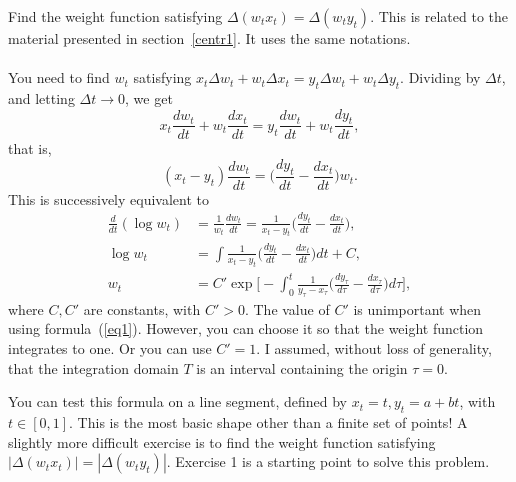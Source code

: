 \documentclass[oneside,10pt]{book}
\begin{document}
\begin{Exercise}Find the weight function satisfying $\Delta(w_t x_t)=\Delta(w_t y_t)$. This is related to the material presented in section~\ref{centr1}. It uses the same notations. \vspace{1ex} \\
 \vspace{1ex} \\
You need to find $w_t$ satisfying $x_t\Delta w_t + w_t\Delta x_t = y_t\Delta w_t + w_t\Delta y_t$. Dividing by $\Delta t$, and letting $\Delta t\rightarrow 0$, we get
$$x_t \frac{dw_t}{dt}+w_t  \frac{dx_t}{dt} = y_t \frac{dw_t}{dt}+w_t  \frac{dy_t}{dt},$$
that is,
$$(x_t - y_t) \frac{dw_t}{dt} = \Big(\frac{dy_t}{dt} - \frac{dx_t}{dt}\Big) w_t.$$
This is successively equivalent to
\begin{align}
\frac{d}{dt}(\log w_t) & = \frac{1}{w_t}\frac{dw_t}{dt}=\frac{1}{x_t - y_t} \Big(\frac{dy_t}{dt} - \frac{dx_t}{dt}\Big), \nonumber \\
\log w_t & = \int \frac{1}{x_t - y_t} \Big(\frac{dy_t}{dt} - \frac{dx_t}{dt}\Big)dt +C,  \nonumber\\
w_t & = C' \exp\Big[-\int_0^t \frac{1}{y_\tau - x_\tau} \Big(\frac{dy_\tau}{d\tau} - \frac{dx_\tau}{d\tau}\Big)d\tau\Big], \nonumber
\end{align}
where $C, C'$ are constants, with $C'>0$. The value of $C'$ is unimportant when using formula~(\ref{eq1}). However, you can choose it so that the weight function integrates to one. Or you can use $C'=1$. I assumed, without loss of generality, that the integration domain $T$ is an interval containing the origin $\tau=0$.

\noindent You can test this formula on a line segment, defined by $x_t=t, y_t=a+bt$, with $t\in[0, 1]$. This is the most basic shape other than a finite set of points! A slightly more difficult exercise is to find the weight function satisfying $|\Delta(w_t x_t)|=|\Delta(w_t y_t)|$. Exercise 1 is a starting point to solve this problem.
\end{Exercise}
\end{document}
